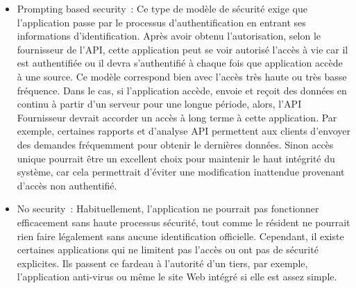 \begin{itemize}
\begin{itemize}
 \end{itemize}
 \item Prompting based security : Ce type de modèle de sécurité exige que l'application passe par le processus d'authentification en entrant ses informations d'identification. Après avoir obtenu l'autorisation, selon le fournisseur de l'API, cette application peut se voir autorisé l’accès à vie car il est authentifiée ou il devra s'authentifié à chaque fois que application accède à une source\cite{12}. Ce modèle correspond bien avec l'accès très haute ou très basse fréquence. Dans le cas, si l'application accède, envoie et reçoit des données en continu à partir d'un serveur pour une longue période, alors, l'API Fournisseur devrait accorder un accès à long terme à cette application. Par exemple, certaines rapports et d'analyse API permettent aux clients d'envoyer des demandes fréquemment pour obtenir le dernières données. Sinon accès unique pourrait être un excellent choix pour maintenir le haut intégrité du système, car cela permettrait d'éviter une modification inattendue provenant  d'accès non authentifié.
 \item No security : Habituellement, l'application ne pourrait pas fonctionner efficacement sans haute processus  sécurité, tout comme le résident ne pourrait rien faire légalement sans aucune identification officielle. Cependant, il existe certaines applications qui ne limitent pas l'accès ou ont pas de sécurité explicites. Ils passent ce fardeau à l'autorité d'un tiers, par exemple, l'application anti-virus ou même le site Web intégré si elle est assez simple.
 \end{itemize}
